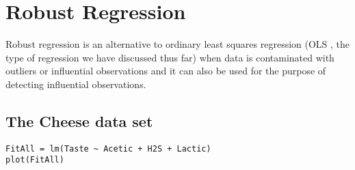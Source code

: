 \documentclass[residuals.tex]{subfiles}
\begin{document}
\newpage
\Large
\section{Robust Regression}

Robust regression is an alternative to ordinary least squares regression (OLS , the type of regression we have discussed thus far) when data is contaminated with outliers or influential observations and it can also be used for the purpose of detecting influential observations.


%
%
%
%
%


\newpage
\subsection{The Cheese data set}

\begin{framed}
\begin{verbatim}
FitAll = lm(Taste ~ Acetic + H2S + Lactic)
plot(FitAll)
\end{verbatim}
\end{framed}
\end{document}
